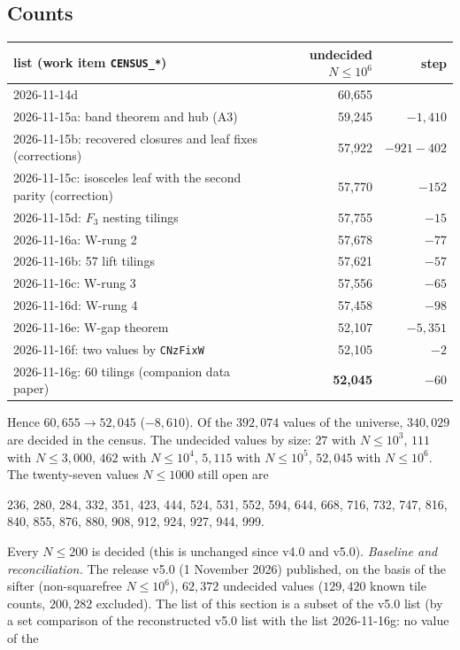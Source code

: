 \documentclass[11pt,reqno]{amsart}
\theoremstyle{plain}
\theoremstyle{definition}
\newcommand{\rec}[1]{\textup{\texttt{#1}}}
\begin{document}
\subsection{Counts}\label{sub:cen:counts}
\begin{center}
\begin{tabular}{lrr}
\hline
list (work item \rec{CENSUS\_*}) & undecided $N\le10^6$ & step\\\hline
2026-11-14d & 60,655 & \\
2026-11-15a: band theorem and hub (A3) & 59,245 & $-1{,}410$\\
2026-11-15b: recovered closures and leaf fixes (corrections) & 57,922 & $-921-402$\\
2026-11-15c: isosceles leaf with the second parity (correction) & 57,770 & $-152$\\
2026-11-15d: $F_3$ nesting tilings & 57,755 & $-15$\\
2026-11-16a: W-rung 2 & 57,678 & $-77$\\
2026-11-16b: 57 lift tilings & 57,621 & $-57$\\
2026-11-16c: W-rung 3 & 57,556 & $-65$\\
2026-11-16d: W-rung 4 & 57,458 & $-98$\\
2026-11-16e: W-gap theorem & 52,107 & $-5{,}351$\\
2026-11-16f: two values by \texttt{CNzFixW} & 52,105 & $-2$\\
2026-11-16g: 60 tilings (companion data paper) & \textbf{52,045} & $-60$\\\hline
\end{tabular}
\end{center}
Hence $60{,}655\to52{,}045$ ($-8{,}610$). Of the $392{,}074$ values of the universe, $340{,}029$ are decided in the
census. The undecided values by size: $27$ with $N\le10^3$, $111$ with $N\le3{,}000$, $462$ with $N\le10^4$,
$5{,}115$ with $N\le10^5$, $52{,}045$ with $N\le10^6$. The twenty-seven values $N\le1000$ still open are
\begin{center}
{\small 236, 280, 284, 332, 351, 423, 444, 524, 531, 552, 594, 644, 668, 716, 732, 747, 816, 840, 855,
876, 880, 908, 912, 924, 927, 944, 999.}
\end{center}
Every $N\le200$ is decided (this is unchanged since v4.0 and v5.0).
\emph{Baseline and reconciliation.} The release v5.0 (1 November 2026) published, on the basis of the sifter (non-squarefree
$N\le10^6$), $62{,}372$ undecided values ($129{,}420$ known tile counts, $200{,}282$ excluded). The list of this section
is a subset of the v5.0 list (by a set comparison of the reconstructed v5.0 list with the list 2026-11-16g: no value of the
\end{document}
